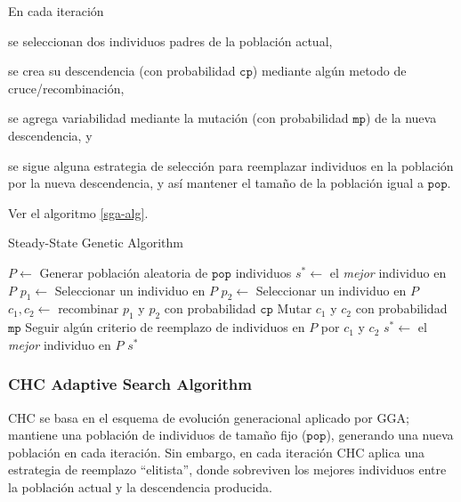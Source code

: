 En cada iteración
\begin{inparaenum}
\item se seleccionan dos individuos padres de la población actual,
\item se crea su descendencia (con probabilidad $\texttt{cp}$) mediante algún metodo de cruce/recombinación,
\item se agrega variabilidad mediante la mutación (con probabilidad $\texttt{mp}$) de la nueva descendencia, y
\item se sigue alguna estrategia de selección para reemplazar individuos en la población por la nueva descendencia, y así mantener el tamaño de la población igual a $\texttt{pop}$.
\end{inparaenum}
Ver el algoritmo \ref{sga-alg}.

\begin{algorithm}
\caption{Steady-State Genetic Algorithm}
\label{sga-alg}
\begin{algorithmic}[1]


\State $P \gets$ Generar población aleatoria de $\texttt{pop}$ individuos
\State $s^* \gets $ el \emph{mejor} individuo en $P$
	\State $p_1 \gets$ Seleccionar un individuo en $P$
	\State $p_2 \gets$ Seleccionar un individuo en $P$
	\State $c_1, c_2 \gets $ recombinar $p_1$ y $p_2$ con probabilidad $\texttt{cp}$
	\State Mutar $c_1$ y $c_2$ con probabilidad $\texttt{mp}$
	\State Seguir algún criterio de reemplazo de individuos en $P$ por $c_1$ y $c_2$
		\State $s^* \gets$ el \emph{mejor} individuo en $P$
	\EndIf
\EndWhile
\State \Return $s^*$

\end{algorithmic}
\end{algorithm}

\subsubsection{CHC Adaptive Search Algorithm}

CHC \cite{eshelman1990chc} se basa en el esquema de evolución generacional aplicado por GGA; mantiene una población de individuos de tamaño fijo ($\texttt{pop}$), generando una nueva población en cada iteración. Sin embargo, en cada iteración CHC aplica una estrategia de reemplazo ``elitista'', donde sobreviven los mejores individuos entre la población actual y la descendencia producida.

